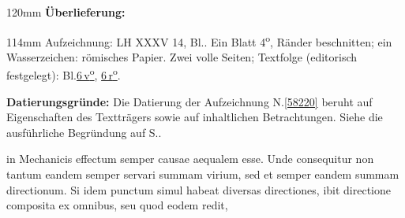 %
\frenchspacing%
\begin{ledgroupsized}[r]{120mm}%
\footnotesize%
\pstart%
\noindent\textbf{Überlieferung:}%
\pend%
\end{ledgroupsized}%
\begin{ledgroupsized}[r]{114mm}%
\footnotesize%
\pstart%
\parindent -6mm%
%
Aufzeichnung:
LH XXXV 14, Bl..
Ein Blatt 4\textsuperscript{o},
Ränder beschnitten;
ein Wasserzeichen: %
römisches Papier.
Zwei volle Seiten; %
Textfolge (editorisch festgelegt): Bl.\;\href{\Scan{LH_35_14_02_006v}}{6\,v\textsuperscript{o}}, \href{\Scan{LH_35_14_02_006r}}{6\,r\textsuperscript{o}}.
\pend%
\end{ledgroupsized}%
\vspace{5mm}%
\begin{ledgroup}%
\footnotesize%
\pstart%
\noindent%
\textbf{Datierungsgründe:}
Die Datierung der Aufzeichnung N.\;\ref{58220} beruht auf Eigenschaften des Textträgers sowie auf inhaltlichen Betrachtungen.
Siehe die ausführliche Begründung auf S.\;\pageref{58220_dat}.%
\pend%
\end{ledgroup}%
%
\frenchspacing%
\vspace{7mm}%
\normalsize%
\pstart%
\noindent%
in Mechanicis%
%
effectum%
semper causae aequalem esse.%
%
Unde consequitur
non tantum eandem semper servari summam virium,%
sed et semper eandem summam directionum.%
\pend%
\pstart%
Si idem punctum simul habeat diversas directiones,%
%
ibit directione composita ex omnibus,%
seu quod eodem
%
redit,%
